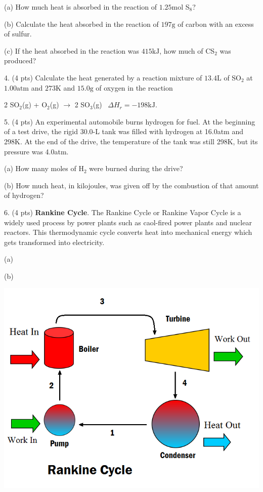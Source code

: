 \documentclass[11pt]{article}
\begin{document}
(a) How much heat is absorbed in the reaction of $1.25\text{mol}$ S$_8$?

(b) Calculate the heat absorbed in the reaction of $197\text{g}$ of carbon
with an excess of sulfur.

(c) If the heat absorbed in the reaction was $415\text{kJ}$, how much of CS$_2$
was produced?

\vspace{2in}

4. (4 pts) Calculate the heat generated by a reaction mixture of $13.4\text{L}$ of SO$_2$
at $1.00\text{atm}$ and $273\text{K}$ and $15.0\text{g}$ of oxygen in the reaction

\begin{center}
  2 SO$_2$(g) + O$_2$(g) $\rightarrow$ 2 SO$_3$(g) \, $\Delta H_r = -198\text{kJ}$.
\end{center}

\vspace{1in}

5. (4 pts) An experimental automobile burns hydrogen for fuel. At the beginning of a test
drive, the rigid 30.0-L tank was filled with hydrogen at 16.0atm and 298K. At the end of
the drive, the temperature of the tank was still 298K, but its pressure was 4.0atm.

(a) How many moles of H$_2$ were burned during the drive?

(b) How much heat, in kilojoules, was given off by the combustion of that amount of
hydrogen?

\vspace{2in}

6. (4 pts) \textbf{Rankine Cycle}. The Rankine Cycle or Rankine Vapor Cycle is a
widely used process by power plants such as caol-fired power plants and nuclear
reactors. This thermodynamic cycle converts heat into mechanical energy which
gets transformed into electricity.

(a)

(b)

\begin{center}
  \includegraphics[scale=0.4]{rankine_cycle.png}
\end{center}

%
%
\end{document}
